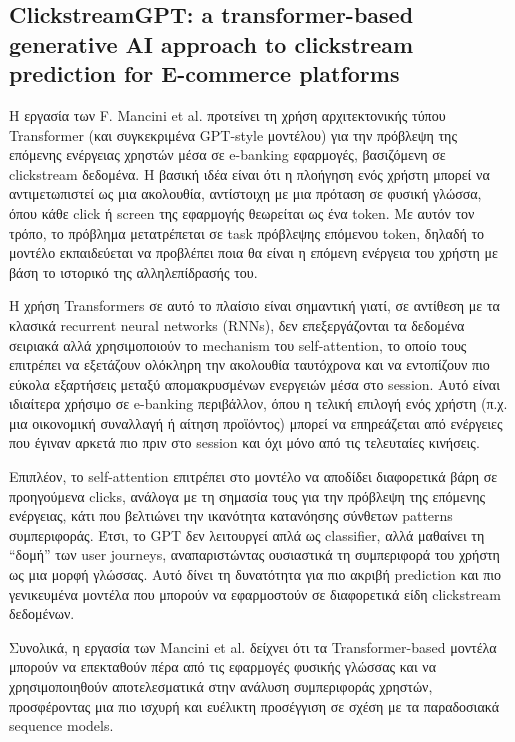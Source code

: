 \documentclass[12pt,a4paper]{article}
\begin{document}
    \subsection{ClickstreamGPT: a transformer-based generative AI approach to clickstream prediction for E-commerce platforms}  
    
    Η εργασία των F. Mancini et al. \cite{Mancini2025} προτείνει τη χρήση αρχιτεκτονικής τύπου Transformer (και συγκεκριμένα GPT-style μοντέλου) για την πρόβλεψη της επόμενης ενέργειας χρηστών μέσα σε e-banking εφαρμογές, βασιζόμενη σε clickstream δεδομένα. Η βασική ιδέα είναι ότι η πλοήγηση ενός χρήστη μπορεί να αντιμετωπιστεί ως μια ακολουθία, αντίστοιχη με μια πρόταση σε φυσική γλώσσα, όπου κάθε click ή screen της εφαρμογής θεωρείται ως ένα token. Με αυτόν τον τρόπο, το πρόβλημα μετατρέπεται σε task πρόβλεψης επόμενου token, δηλαδή το μοντέλο εκπαιδεύεται να προβλέπει ποια θα είναι η επόμενη ενέργεια του χρήστη με βάση το ιστορικό της αλληλεπίδρασής του.
    
    Η χρήση Transformers σε αυτό το πλαίσιο είναι σημαντική γιατί, σε αντίθεση με τα κλασικά recurrent neural networks (RNNs), δεν επεξεργάζονται τα δεδομένα σειριακά αλλά χρησιμοποιούν το mechanism του self-attention, το οποίο τους επιτρέπει να εξετάζουν ολόκληρη την ακολουθία ταυτόχρονα και να εντοπίζουν πιο εύκολα εξαρτήσεις μεταξύ απομακρυσμένων ενεργειών μέσα στο session. Αυτό είναι ιδιαίτερα χρήσιμο σε e-banking περιβάλλον, όπου η τελική επιλογή ενός χρήστη (π.χ. μια οικονομική συναλλαγή ή αίτηση προϊόντος) μπορεί να επηρεάζεται από ενέργειες που έγιναν αρκετά πιο πριν στο session και όχι μόνο από τις τελευταίες κινήσεις.
    
    Επιπλέον, το self-attention επιτρέπει στο μοντέλο να αποδίδει διαφορετικά βάρη σε προηγούμενα clicks, ανάλογα με τη σημασία τους για την πρόβλεψη της επόμενης ενέργειας, κάτι που βελτιώνει την ικανότητα κατανόησης σύνθετων patterns συμπεριφοράς. Έτσι, το GPT δεν λειτουργεί απλά ως classifier, αλλά μαθαίνει τη “δομή” των user journeys, αναπαριστώντας ουσιαστικά τη συμπεριφορά του χρήστη ως μια μορφή γλώσσας. Αυτό δίνει τη δυνατότητα για πιο ακριβή prediction και πιο γενικευμένα μοντέλα που μπορούν να εφαρμοστούν σε διαφορετικά είδη clickstream δεδομένων.
    
    Συνολικά, η εργασία των Mancini et al. δείχνει ότι τα Transformer-based μοντέλα μπορούν να επεκταθούν πέρα από τις εφαρμογές φυσικής γλώσσας και να χρησιμοποιηθούν αποτελεσματικά στην ανάλυση συμπεριφοράς χρηστών, προσφέροντας μια πιο ισχυρή και ευέλικτη προσέγγιση σε σχέση με τα παραδοσιακά sequence models.
    
\end{document}
